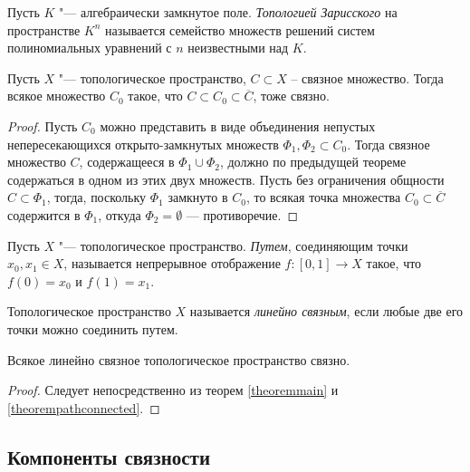 \begin{definition}
	Пусть $K$ "--- алгебраически замкнутое поле. \textit{Топологией Зарисского} на пространстве $K^n$ называется семейство множеств решений систем полиномиальных уравнений с $n$ неизвестными над $K$.
\end{definition}

\begin{theorem} \label{theoremclosureconnected}
	Пусть $X$ "--- топологическое пространство, $C \subset X$ -- связное множество. Тогда всякое множество $C_0$ такое, что $C \subset C_0 \subset \overline{C}$, тоже связно.
\end{theorem}

\begin{proof}
	Пусть $C_0$ можно представить в виде объединения непустых непересекающихся открыто-замкнутых множеств $\Phi_1, \Phi_2 \subset C_0$. Тогда связное множество $C$, содержащееся в $\Phi_1 \cup \Phi_2$, должно по предыдущей теореме содержаться в одном из этих двух множеств. Пусть без ограничения общности $C \subset \Phi_1$, тогда, поскольку $\Phi_1$ замкнуто в $C_0$, то всякая точка множества $C_0 \subset \overline C$ содержится в $\Phi_1$, откуда $\Phi_2 = \emptyset$ --- противоречие.
\end{proof}

\begin{definition}
	Пусть $X$ "--- топологическое пространство. \textit{Путем}, соединяющим точки $x_0, x_1 \in X$, называется непрерывное отображение $f: [0, 1] \rightarrow X$ такое, что $f(0) = x_0$ и $f(1) = x_1$.
\end{definition}

\begin{definition}
	Топологическое пространство $X$ называется \textit{линейно связным}, если любые две его точки можно соединить путем.
\end{definition}

\begin{proposition}
	Всякое линейно связное топологическое пространство связно.
\end{proposition}

\begin{proof}
	Следует непосредственно из теорем \ref{theoremmain} и \ref{theorempathconnected}.
\end{proof}

\subsection{Компоненты связности}

